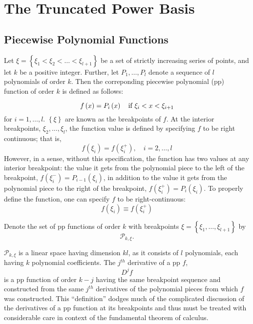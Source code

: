 \documentclass[12pt]{article}
\newcommand*\outlineskeleton{\color{green}}
\begin{document}
\nocite{*}

\section{{\outlineskeleton The Truncated Power Basis}}
\subsection{{\outlineskeleton Piecewise Polynomial Functions}}

Let $\xi = \left\{ \xi_1<\xi_2<\dots<\xi_{l+1} \right\}$ be a set of strictly increasing series of points, and let $k$ be a positive integer. Further, let $P_1,\dots,P_l$ denote a sequence of $l$ polynomials of order $k$. Then the correponding piecewise polynomial (pp) function of order $k$ is defined as follows:

\[
f\left(x\right) = P_i\left(x\right) \quad \textup{if } \xi_i < x < \xi_{i+1}
\] 
\noindent
for $i=1,\dots,l$. $\left\{\xi\right\}$ are known as the breakpoints of $f$. At the interior breakpoints, $\xi_2,\dots, \xi_l$, the function value is defined by specifying $f$ to be right continuous; that is, 
\[
f\left(\xi_i\right) = f\left(\xi_i^+\right),\quad i=2,\dots,l
\]
However, in a sense, without this specification, the function has two values at any interior breakpoint: the value it gets from the polynomial piece to the left of the breakpoint, $f\left(\xi_i^-\right) = P_{i-1}\left(\xi_i\right)$, in addition to the value it gets from the polynomial piece to the right of the breakpoint, $f\left(\xi_i^+\right) = P_{i}\left(\xi_i\right)$. To properly define the function, one can specify $f$ to be right-continuous:
\begin{equation}
f\left(\xi_i\right) \equiv f\left(\xi_i^+\right) 
\end{equation}

Denote the set of pp functions of order $k$ with breakpoints $\xi=\left\{\xi_1,\dots,\xi_{l+1}\right\}$ by 
\[
\mathcal{P}_{k,\xi}.
\]

$\mathcal{P}_{k,\xi}$ is a linear space having dimension $kl$, as it consists of $l$ polynomials, each having $k$ polynomial coefficients. The $j^{th}$ derivative of a pp $f$,
\[
D^jf
\]
\noindent
is a pp function of order $k-j$ having the same breakpoint sequence and constructed from the same $j^{th}$ derivatives of the polynomial pieces from which $f$ was constructed. This ``definition'' dodges much of the complicated discussion of the derivatives of a pp function at its breakpoints and thus must be treated with considerable care in context of the fundamental theorem of calculus.
\end{document}
